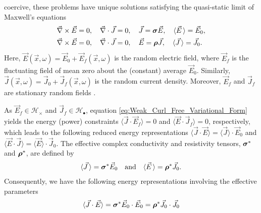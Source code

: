 \documentclass{cmslatex}
\newcommand\bsig{\mbox{\boldmath${\sigma}$}}
\newcommand\brho{\mbox{\boldmath${\rho}$}}
\begin{document}
coercive, these problems have unique solutions
\cite{Golden:CMP-473,Papanicolaou:RF-835} satisfying the quasi-static
limit of Maxwell's equations  \cite{Jackson-1999} 
%
\begin{align}   \label{eq:Maxwells_Equations_E}  
 &\vec{\nabla}\times\vec{E}=0, \quad
  \vec{\nabla}\cdot\vec{J}=0,\quad
  \vec{J}=\bsig\vec{E},\quad
  \langle\vec{E}\,\rangle=\vec{E}_0, \\
%
   &\vec{\nabla}\times\vec{E}=0, \quad
   \vec{\nabla}\cdot\vec{J}=0, \quad
   \vec{E}=\brho\vec{J},\quad
   \langle\vec{J}\,\rangle=\vec{J}_0.
   \notag  
\end{align}
%
Here, $\vec{E}(\vec{x},\omega)=\vec{E}_0+\vec{E}_f(\vec{x},\omega)$ is the
random electric field, where $\vec{E}_f$ is the fluctuating field of
mean zero about the (constant) average $\vec{E}_0$. Similarly,
$\vec{J}(\vec{x},\omega)=\vec{J}_0+\vec{J}_f(\vec{x},\omega)$ is the random  
current density. Moreover, $\vec{E}_f$ and $\vec{J}_f$ are stationary
random fields \cite{Golden:CMP-473}. 




As $\vec{E}_f\in\mathscr{H}_\times$ and $\vec{J}_f\in\mathscr{H}_\bullet$, equation
\eqref{eq:Weak_Curl_Free_Variational_Form} yields the energy (power)
\cite{Jackson-1999} constraints $\langle\vec{J}\cdot\vec{E}_f\rangle=0$ and
$\langle\vec{E}\cdot\vec{J}_f\rangle=0$, respectively, which leads to the following
reduced energy representations $\langle\vec{J}\cdot\vec{E}\rangle=\langle\vec{J}\rangle\cdot\vec{E}_0$
and $\langle\vec{E}\cdot\vec{J}\rangle=\langle\vec{E}\rangle\cdot\vec{J}_0$. The effective complex
conductivity and resistivity tensors, $\bsig^*$ and $\brho^*$, are
defined by   
%
\begin{align}\label{eq:eff_eps_def}
    \langle \vec{J} \,\rangle=  \bsig^* \vec{E}_0
    \quad \text{and} \quad    
    \langle \vec{E} \,\rangle=  \brho^*\vec{J}_0.
\end{align}
%
Consequently, we have the following energy representations involving
the effective parameters 
%
\begin{align}\label{eq:Energy_Reps}
  \langle\vec{J}\cdot\vec{E}\rangle=\bsig^*\vec{E}_0\cdot\vec{E}_0=\brho^*\vec{J}_0\cdot\vec{J}_0
\end{align}
%
\end{document}
